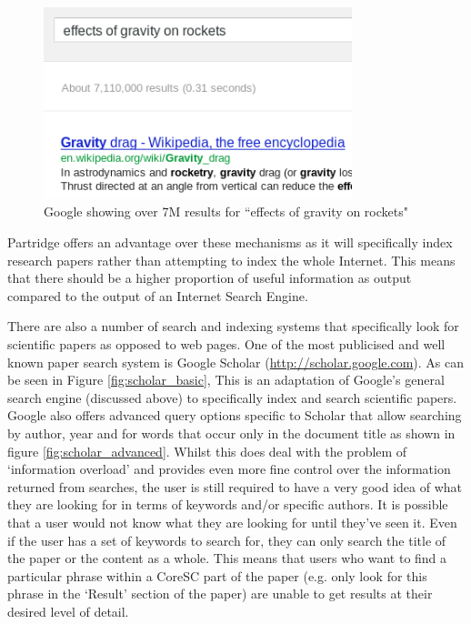 \documentclass[12pt,a4paper]{article}
\begin{document}
\begin{figure}[!ht]
\includegraphics[width=0.80\textwidth]{images/space_rocket_query.png}
\caption{{Google showing over 7M results for ``effects of gravity on rockets"}}
\label{fig:rocket_results}
\end{figure}

Partridge offers an advantage over these mechanisms as it will specifically
index research papers rather than attempting to index the whole Internet.
This means that there should be a higher proportion of useful information as
output compared to the output of an Internet Search Engine.

There are also a number of search and indexing systems that specifically look
for scientific papers as opposed to web pages. One of the most publicised and
well known paper search system is Google Scholar
(\url{http://scholar.google.com}).  As can be seen in Figure
\ref{fig:scholar_basic}, This is an adaptation of Google's general search
engine (discussed above) to specifically index and search scientific papers.
Google also offers advanced query options specific to Scholar that allow
searching by author, year and for words that occur only in the document title
as shown in figure \ref{fig:scholar_advanced}. Whilst this does deal with the
problem of `information overload' and provides even more fine control over the
information returned from searches,  the user is still required to have a very
good idea of what they are looking for in terms of keywords and/or specific
authors. It is possible that a user would not know what they are looking for
until they've seen it. Even if the user has a set of keywords to search for,
they can only search the title of the paper or the content as a whole. This
means that users who want to find a particular phrase within a CoreSC part of
the paper (e.g. only look for this phrase in the `Result' section of the
paper) are unable to get results at their desired level of detail.
\end{document}
